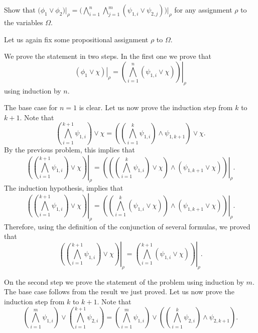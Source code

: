 \documentclass[addpoints]{exam}
\begin{document}
\begin{questions}
\begin{parts}
				Show that $\big(\phi_1 \lor \phi_2\big) \big\rvert_\rho =
				    \big(\bigwedge_{i = 1}^n \bigwedge_{j = 1}^m
				        (\psi_{1, i} \lor \psi_{2, j})\big) \big\rvert_\rho$ for any assignment
				$\rho$ to the variables $\Omega$.
            \begin{solution}[\stretch{1}]
              Let us again fix some propositional assignment $\rho$ to $\Omega$.

We prove the statement in two steps. In the first one we prove that
\[
    \left.\left(
        \phi_1 \lor \chi
    \right)\right\rvert_\rho =
    \left.\left(
        \bigwedge_{i = 1}^{n} \left(\psi_{1, i} \lor \chi\right)
    \right)\right\rvert_\rho
\]
using induction by $n$.

The base case for $n = 1$ is clear. Let us now prove the induction step from
$k$ to $k + 1$. Note that
\[
    \left(
        \bigwedge_{i = 1}^{k + 1} \psi_{1, i}
    \right) \lor \chi =
    \left(
        \left(
            \bigwedge_{i = 1}^{k} \psi_{1, i}
        \right) \land \psi_{1, k + 1}
    \right) \lor
        \chi.
\]
By the previous problem, this implies that
\[
    \left.\left(
        \left(
            \bigwedge_{i = 1}^{k + 1} \psi_{1, i}
        \right) \lor \chi
    \right)\right\rvert_\rho =
    \left.\left(
        \left(
            (\bigwedge_{i = 1}^{k} \psi_{1, i}) \lor \chi
        \right) \land
        \left(
            \psi_{1, k + 1} \lor \chi
        \right)
    \right)\right\rvert_\rho.
\]
The induction hypothesis, implies that
\[
    \left.\left(
        \left(
            \bigwedge_{i = 1}^{k + 1} \psi_{1, i}
        \right) \lor \chi
    \right)\right\rvert_\rho =
    \left.\left(
        \left(
            \bigwedge_{i = 1}^{k} \left(\psi_{1, i} \lor \chi\right)
        \right) \land
        \left(
            \psi_{1, k + 1} \lor \chi
        \right)
    \right)\right\rvert_\rho.
\]
Therefore, using the definition of the conjunction of several formulas,
we proved that
\[
    \left.\left(
        \left(
            \bigwedge_{i = 1}^{k + 1} \psi_{1, i}
        \right) \lor \chi
    \right)\right\rvert_\rho =
    \left.\left(
        \bigwedge_{i = 1}^{k + 1} \left(\psi_{1, i} \lor \chi\right)
    \right)\right\rvert_\rho.
\]

On the second step we prove the statement of the problem using induction by $m$.
The base case follows from the result we just proved.
Let us now prove the induction step from $k$ to $k + 1$.
Note that
\[
    \left(
        \bigwedge_{i = 1}^m \psi_{1, i}
    \right) \lor
    \left(
        \bigwedge_{i = 1}^{k + 1} \psi_{2, i}
    \right) =
    \left(
        \bigwedge_{i = 1}^m \psi_{1, i}
    \right) \lor
    \left(
        \left(
            \bigwedge_{i = 1}^{k} \psi_{2, i}
        \right) \land \psi_{2, k + 1}
    \right).
\]


\end{solution}
\end{parts}
\end{questions}
\end{document}
